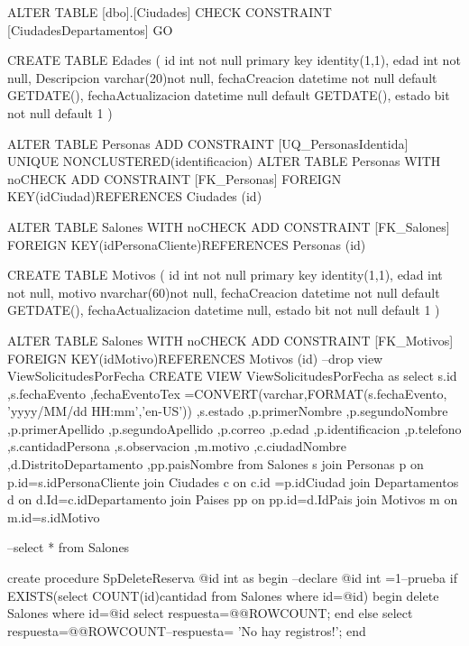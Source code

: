 ALTER TABLE [dbo].[Ciudades] CHECK CONSTRAINT [CiudadesDepartamentos]
GO

CREATE TABLE Edades
(
	id int not null primary key identity(1,1),
	edad int not null,
	Descripcion varchar(20)not null,
    fechaCreacion datetime not null default GETDATE(),
	fechaActualizacion datetime null default GETDATE(),
    estado bit not null default 1
)

ALTER TABLE Personas ADD  CONSTRAINT [UQ_PersonasIdentida] UNIQUE NONCLUSTERED(identificacion)
ALTER TABLE Personas  WITH noCHECK ADD  CONSTRAINT [FK_Personas] FOREIGN KEY(idCiudad)REFERENCES Ciudades (id)

ALTER TABLE Salones  WITH noCHECK ADD  CONSTRAINT [FK_Salones] FOREIGN KEY(idPersonaCliente)REFERENCES Personas (id)


CREATE TABLE Motivos
(
	id int not null primary key identity(1,1),
	edad int not null,
	motivo nvarchar(60)not null,
    fechaCreacion datetime not null default GETDATE(),
	fechaActualizacion datetime null,
    estado bit not null default 1
)


ALTER TABLE Salones  WITH noCHECK ADD  CONSTRAINT [FK_Motivos] FOREIGN KEY(idMotivo)REFERENCES Motivos (id)
--drop view ViewSolicitudesPorFecha
CREATE VIEW  ViewSolicitudesPorFecha as
select s.id
,s.fechaEvento
,fechaEventoTex =CONVERT(varchar,FORMAT(s.fechaEvento, 'yyyy/MM/dd HH:mm','en-US'))
,s.estado
,p.primerNombre
,p.segundoNombre
,p.primerApellido
,p.segundoApellido
,p.correo
,p.edad
,p.identificacion
,p.telefono
,s.cantidadPersona
,s.observacion
,m.motivo
,c.ciudadNombre
,d.DistritoDepartamento
,pp.paisNombre
from Salones s
join Personas p on p.id=s.idPersonaCliente
join Ciudades c on c.id =p.idCiudad
join Departamentos d on d.Id=c.idDepartamento
join Paises pp on pp.id=d.IdPais
join Motivos m on m.id=s.idMotivo


--select * from Salones

create procedure SpDeleteReserva
@id int 
as
begin 
--declare @id int =1--prueba 
if EXISTS(select COUNT(id)cantidad from Salones where id=@id)
	begin
	delete Salones where id=@id 
	select respuesta=@@ROWCOUNT; 
	end
else 
	select respuesta=@@ROWCOUNT--respuesta= 'No hay registros!';
end